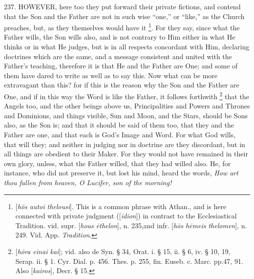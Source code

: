 237. HOWEVER,
here too they put forward their private fictions, and contend that the
Son and the Father are not in such wise ``one,'' or ``like,'' as the
Church preaches, but, as they themselves would have it \footnote{[\emph{h\={o}s autoi thelousi}]. This is a common phrase with Athan.,
and is here connected with private judgment ([\emph{idion}]) in
contrast to the Ecclesiastical Tradition. vid. supr. [\emph{hous \={e}thelon}],
n. 235,\emph{}and infr. [\emph{h\={o}s h\={e}meis thelomen}],
n. 249. Vid. App. \emph{Tradition}.}. For they say, since what the Father wills, the Son wills also,
and is not contrary to Him either in what He thinks or in what He
judges, but is in all respects concordant with Him, declaring
doctrines which are the same, and a message consistent and united with
the Father's teaching, therefore it is that He and the Father are One;
and some of them have dared to write as well as to say this. Now what
can be more extravagant than this? for if this is the reason why the
Son and the Father are One, and if in this way the Word is like the
Father, it follows forthwith \footnote{[\emph{h\={o}ra einai kai}]; vid. also de Syn. § 34, Orat. i. §
15, ii. § 6, iv. § 10, 19, Serap. ii. § 1. Cyr. Dial. p. 456. Thes.
p. 255, fin. Euseb. c. Marc. pp.\emph{}47, 91. Also [\emph{kairos}],
Decr. § 15.} that the Angels too, and the other beings above us,
Principalities and Powers and Thrones and Dominions, and things
visible, Sun and Moon, and the Stars, should be Sons also, as the Son
is; and that it should be said of them too, that they and the Father
are one, and that each is God's Image and Word. For what God wills,
that will they; and neither in judging nor in doctrine are they
discordant, but in all things are obedient to their Maker. For they
would not have remained in their own glory, unless, what the Father
willed, that they had willed also. He, for instance, who did not
preserve it, \emph{}but lost his mind, heard the words, \emph{How
art thou fallen from heaven, O Lucifer, son of the morning!}

